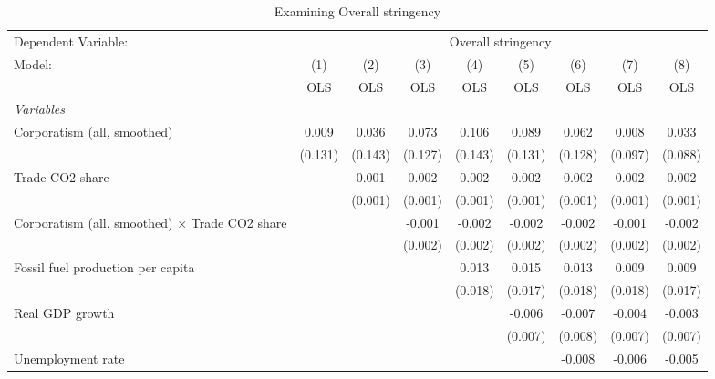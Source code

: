 
\begin{table}[htbp]
   \caption{Examining Overall stringency}
   \centering
   \begin{tabular}{lcccccccc}
      \toprule
      Dependent Variable: & \multicolumn{8}{c}{Overall stringency}\\
      Model:                                                & (1)     & (2)     & (3)     & (4)     & (5)     & (6)     & (7)     & (8)\\  
                                                            &  OLS    & OLS     & OLS     & OLS     & OLS     & OLS     & OLS     & OLS\\  
      \midrule
      \emph{Variables}\\
      Corporatism (all, smoothed)                           & 0.009   & 0.036   & 0.073   & 0.106   & 0.089   & 0.062   & 0.008   & 0.033\\   
                                                            & (0.131) & (0.143) & (0.127) & (0.143) & (0.131) & (0.128) & (0.097) & (0.088)\\   
      Trade CO2 share                                       &         & 0.001   & 0.002   & 0.002   & 0.002   & 0.002   & 0.002   & 0.002\\   
                                                            &         & (0.001) & (0.001) & (0.001) & (0.001) & (0.001) & (0.001) & (0.001)\\   
      Corporatism (all, smoothed) $\times$ Trade CO2 share  &         &         & -0.001  & -0.002  & -0.002  & -0.002  & -0.001  & -0.002\\   
                                                            &         &         & (0.002) & (0.002) & (0.002) & (0.002) & (0.002) & (0.002)\\   
      Fossil fuel production per capita                     &         &         &         & 0.013   & 0.015   & 0.013   & 0.009   & 0.009\\   
                                                            &         &         &         & (0.018) & (0.017) & (0.018) & (0.018) & (0.017)\\   
      Real GDP growth                                       &         &         &         &         & -0.006  & -0.007  & -0.004  & -0.003\\   
                                                            &         &         &         &         & (0.007) & (0.008) & (0.007) & (0.007)\\   
      Unemployment rate                                     &         &         &         &         &         & -0.008  & -0.006  & -0.005\\   

\end{tabular}
\end{table}
